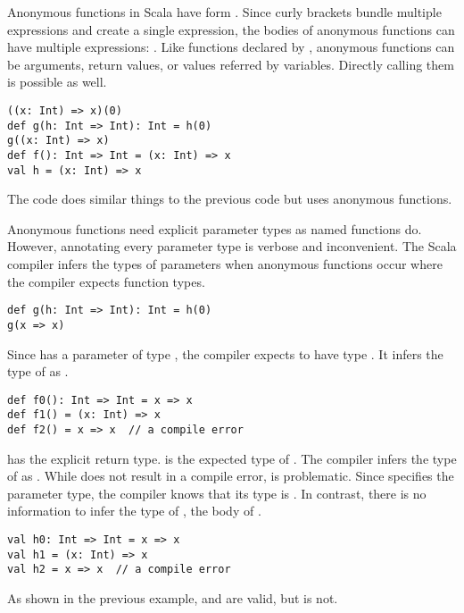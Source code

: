 Anonymous functions in Scala have form .
Since curly brackets bundle multiple expressions and create
a single expression, the bodies of anonymous functions can have multiple
expressions: . Like functions declared by ,
anonymous functions can be arguments, return values, or values referred by
variables. Directly calling them is possible as well.

\begin{verbatim}
((x: Int) => x)(0)
def g(h: Int => Int): Int = h(0)
g((x: Int) => x)
def f(): Int => Int = (x: Int) => x
val h = (x: Int) => x
\end{verbatim}

The code does similar things to the previous code but uses anonymous functions.

Anonymous functions need explicit parameter types as named functions do. However,
annotating every parameter type is verbose and inconvenient. The Scala compiler
infers the types of parameters when anonymous functions occur where the compiler
expects function types.

\begin{verbatim}
def g(h: Int => Int): Int = h(0)
g(x => x)
\end{verbatim}

Since  has a parameter of type , the compiler expects
 to have type . It infers the type of  as
.

\begin{verbatim}
def f0(): Int => Int = x => x
def f1() = (x: Int) => x
def f2() = x => x  // a compile error
\end{verbatim}

 has the explicit return type.  is the expected type of
. The compiler infers the type of  as . While
 does not result in a compile error,  is problematic. Since
 specifies the parameter type, the compiler knows that its
type is . In contrast, there is no information to infer the type
of , the body of .

\begin{verbatim}
val h0: Int => Int = x => x
val h1 = (x: Int) => x
val h2 = x => x  // a compile error
\end{verbatim}

As shown in the previous example,  and  are valid, but
 is not.


